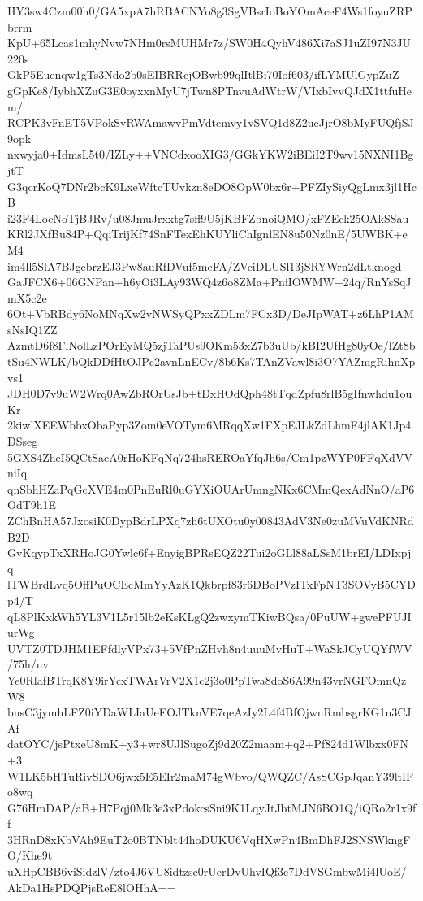 HY3sw4Czm00h0/GA5xpA7hRBACNYo8g3SgVBsrIoBoYOmAceF4Ws1foyuZRPbrrm
KpU+65Lcas1mhyNvw7NHm0rsMUHMr7z/SW0H4QyhV486Xi7aSJ1uZI97N3JU220s
GkP5Euenqw1gTs3Ndo2b0sEIBRRcjOBwb99qlItlBi70Iof603/ifLYMUlGypZuZ
gGpKe8/IybhXZuG3E0oyxxnMyU7jTwn8PTnvuAdWtrW/VIxbIvvQJdX1ttfuHem/
RCPK3vFnET5VPokSvRWAmawvPmVdtemvy1vSVQ1d8Z2ueJjrO8bMyFUQfjSJ9opk
nxwyja0+IdmsL5t0/IZLy++VNCdxooXIG3/GGkYKW2iBEiI2T9wv15NXNI1BgjtT
G3qcrKoQ7DNr2bcK9LxeWftcTUvkzn8eDO8OpW0bx6r+PFZIySiyQgLmx3jl1HcB
i23F4LocNoTjBJRv/u08JmuJrxxtg7sff9U5jKBFZbnoiQMO/xFZEck25OAkSSau
KRl2JXfBu84P+QqiTrijKf74SnFTexEhKUYliChIgnlEN8u50Nz0nE/5UWBK+eM4
im4ll5SlA7BJgebrzEJ3Pw8auRfDVuf5meFA/ZVciDLUSl13jSRYWrn2dLtknogd
GaJFCX6+06GNPan+h6yOi3LAy93WQ4z6o8ZMa+PniIOWMW+24q/RnYsSqJmX5c2e
6Ot+VbRBdy6NoMNqXw2vNWSyQPxxZDLm7FCx3D/DeJIpWAT+z6LhP1AMsNsIQ1ZZ
AzmtD6f8FlNolLzPOrEyMQ5zjTaPUs9OKm53xZ7b3uUb/kBI2UfHg80yOe/lZt8b
tSu4NWLK/bQkDDfHtOJPc2avnLnECv/8b6Ks7TAnZVawl8i3O7YAZmgRihnXpvs1
JDH0D7v9uW2Wrq0AwZbROrUsJb+tDxHOdQph48tTqdZpfu8rlB5gIfnwhdu1ouKr
2kiwlXEEWbbxObaPyp3Zom0eVOTym6MRqqXw1FXpEJLkZdLhmF4jlAK1Jp4DSseg
5GXS4ZheI5QCtSaeA0rHoKFqNq724hsREROaYfqJh6s/Cm1pzWYP0FFqXdVVniIq
qnSbhHZaPqGcXVE4m0PnEuRl0uGYXiOUArUmngNKx6CMmQexAdNnO/aP6OdT9h1E
ZChBnHA57JxosiK0DypBdrLPXq7zh6tUXOtu0y00843AdV3Ne0zuMVuVdKNRdB2D
GvKqypTxXRHoJG0Ywlc6f+EnyigBPRsEQZ22Tui2oGLl88aLSsM1brEI/LDIxpjq
lTWBrdLvq5OffPuOCEcMmYyAzK1Qkbrpf83r6DBoPVzITxFpNT3SOVyB5CYDp4/T
qL8PlKxkWh5YL3V1L5r15lb2eKsKLgQ2zwxymTKiwBQsa/0PuUW+gwePFUJIurWg
UVTZ0TDJHM1EFfdlyVPx73+5VfPnZHvh8n4uuuMvHuT+WaSkJCyUQYfWV/75h/uv
Ye0RlafBTrqK8Y9irYcxTWArVrV2X1c2j3o0PpTwa8doS6A99n43vrNGFOmnQzW8
bnsC3jymhLFZ0iYDaWLIaUeEOJTknVE7qeAzIy2L4f4BfOjwnRmbsgrKG1n3CJAf
datOYC/jsPtxeU8mK+y3+wr8UJlSugoZj9d20Z2maam+q2+Pf824d1Wlbxx0FN+3
W1LK5bHTuRivSDO6jwx5E5EIr2maM74gWbvo/QWQZC/AsSCGpJqanY39ltIFo8wq
G76HmDAP/aB+H7Pqj0Mk3e3xPdokcsSni9K1LqyJtJbtMJN6BO1Q/iQRo2r1x9ff
3HRnD8xKbVAh9EuT2o0BTNblt44hoDUKU6VqHXwPn4BmDhFJ2SNSWkngFO/Khe9t
uXHpCBB6viSidzlV/zto4J6VU8idtzsc0rUerDvUhvIQf3c7DdVSGmbwMi4lUoE/
AkDa1HsPDQPjsReE8lOHhA==
